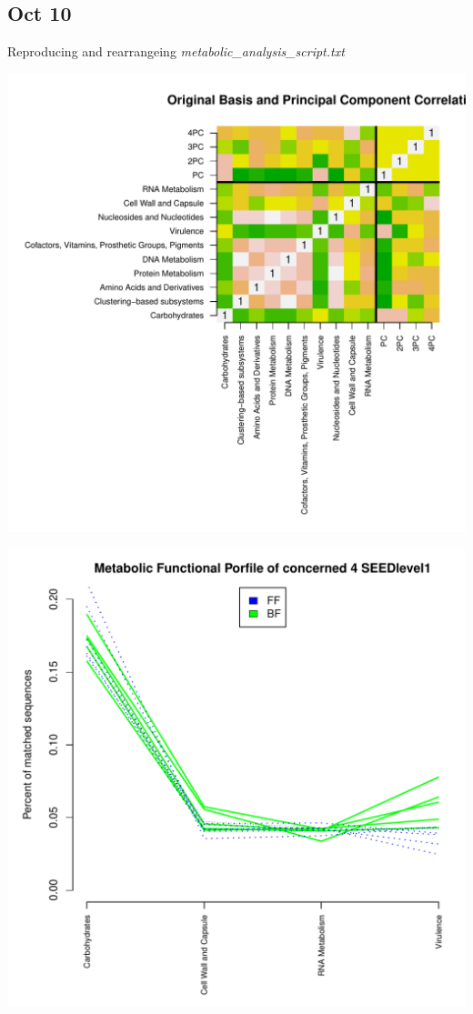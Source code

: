 \documentclass{article}\usepackage[]{graphicx}\usepackage[]{color}
\makeatletter
\def\maxwidth{ %
  \ifdim\Gin@nat@width>\linewidth
    \linewidth
  \else
    \Gin@nat@width
  \fi
}
\makeatother
\begin{document}
  \subsection{Oct 10}
   Reproducing and rearrangeing \textit{metabolic\_\ignorespaces analysis\_\ignorespaces script.txt}
   \begin{center}
\begin{Schunk}


{\centering \includegraphics[width=\maxwidth]{figure/oct_10-1} 

}



{\centering \includegraphics[width=\maxwidth]{figure/oct_10-2} 

}

\end{Schunk}
   \end{center}
   
\end{document}
